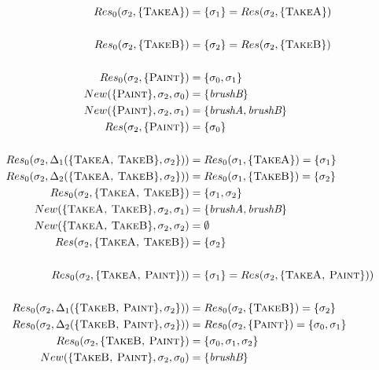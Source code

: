 \documentclass[11pt,a4paper]{article}
\begin{document}
\begin{itemize}
    \begin{align*}
		Res_0(\sigma_2, \{ \textsc{TakeA} \}) &= \{ \sigma_1 \} = Res(\sigma_2, \{ \textsc{TakeA} \}) \\
        \\    	
    	Res_0(\sigma_2, \{ \textsc{TakeB} \}) &= \{ \sigma_2 \} = Res(\sigma_2, \{ \textsc{TakeB} \}) \\
    	\\
    	Res_0(\sigma_2, \{ \textsc{Paint} \}) &= \{ \sigma_0, \sigma_1 \}  \\
    	New(\{ \textsc{Paint} \}, \sigma_2, \sigma_0) &=  \{ \textit{brushB} \} \\    
    	New(\{ \textsc{Paint} \}, \sigma_2, \sigma_1) &=  \{ \textit{brushA}, \textit{brushB}\} \\   
    	Res(\sigma_2, \{ \textsc{Paint} \}) &= \{ \sigma_0 \} \\ 
    	\\     
    	Res_0(\sigma_2, \Delta_1(\{\textsc{TakeA, TakeB} \}, \sigma_2 \})) &= Res_0(\sigma_1, \{ \textsc{TakeA} \}) = \{ \sigma_1 \} \\
    	Res_0(\sigma_2, \Delta_2(\{\textsc{TakeA, TakeB} \}, \sigma_2 \})) &= Res_0(\sigma_1, \{ \textsc{TakeB} \}) = \{ \sigma_2 \} \\
		Res_0(\sigma_2, \{\textsc{TakeA, TakeB} \}) &= \{ \sigma_1, \sigma_2 \} \\  
        New(\{\textsc{TakeA, TakeB} \}, \sigma_2, \sigma_1) &=  \{ \textit{brushA}, \textit{brushB} \} \\    
		New(\{\textsc{TakeA, TakeB} \}, \sigma_2, \sigma_2) &=  \emptyset \\    
        Res(\sigma_2, \{\textsc{TakeA, TakeB} \}) &= \{ \sigma_2 \} \\
        \\
    	Res_0(\sigma_2, \{ \textsc{TakeA, Paint} \})) &=  \{ \sigma_1 \} = Res(\sigma_2, \{ \textsc{TakeA, Paint} \})) \\
        \\ 
    	Res_0(\sigma_2, \Delta_1(\{\textsc{TakeB, Paint} \}, \sigma_2 \})) &= Res_0(\sigma_2, \{ \textsc{TakeB} \}) = \{ \sigma_2 \} \\
    	Res_0(\sigma_2, \Delta_2(\{\textsc{TakeB, Paint} \}, \sigma_2 \})) &= Res_0(\sigma_2, \{ \textsc{Paint} \}) = \{ \sigma_0, \sigma_1 \} \\
		Res_0(\sigma_2, \{\textsc{TakeB, Paint} \}) &= \{ \sigma_0, \sigma_1, \sigma_2 \} \\  
        New(\{ \textsc{TakeB, Paint} \}, \sigma_2, \sigma_0) &= \{ \textit{brushB}\} \\    

\end{align*}
\end{itemize}
\end{document}
